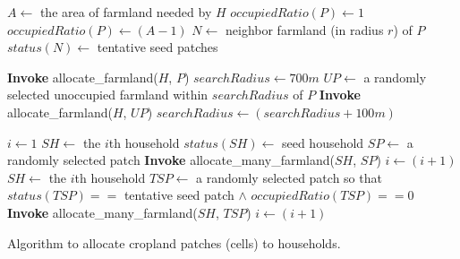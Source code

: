 \documentclass[11pt, titlepage]{article}
\newenvironment{Algorithm}[2][tbh]%
{\begin{myalgo}[#1]
\centering
\begin{minipage}{#2}
\begin{algorithm}[H]}%
{\end{algorithm}
\end{minipage}
\end{myalgo}}
\begin{document}
\begin{Algorithm}[t]{14cm} 
\begin{algorithmic}[1] 
 
\State $A \leftarrow $ the area of farmland needed by $H$ 
\State $occupiedRatio(P) \leftarrow 1 $ 
\Else \State $occupiedRatio(P) \leftarrow (A - 1)$  
\EndIf 
\State $N \leftarrow $ neighbor farmland (in radius $r$) of $P$  
\State $status(N) \leftarrow $ tentative seed patches 
\EndProcedure 
\Statex

  
\State \textbf{Invoke} allocate\_farmland($H$, $P$) 
\Repeat
\State $searchRadius \leftarrow 700m $  
\State $UP \leftarrow $ a randomly selected unoccupied farmland within $searchRadius$ of $P$ 
\State \textbf{Invoke} allocate\_farmland($H$, $UP$) 
\State $searchRadius \leftarrow (searchRadius + 100m) $ 
\EndIf 
{} 
\EndProcedure 
\Statex

\State $i \leftarrow 1$  
\Repeat 
\State $SH \leftarrow $ the $i$th household 
\State $status(SH) \leftarrow $ seed household 
\State $SP \leftarrow $ a randomly selected patch 
\State \textbf{Invoke} allocate\_many\_farmland($SH$, $SP$) 
\State $i \leftarrow (i+1) $ 
 \Repeat 
\State $SH \leftarrow $ the $i$th household 
\State $TSP \leftarrow $ a randomly selected patch so that $status(TSP) == $ tentative seed patch $\wedge$
$occupiedRatio(TSP) == 0$ 
\State \textbf{Invoke} allocate\_many\_farmland($SH$, $TSP$) 
\State $i \leftarrow (i+1) $
\EndProcedure

\end{algorithmic} 
\caption{Algorithm to allocate cropland patches (cells) to households.} 
\label{alg1} 
\end{Algorithm}
\end{document}
